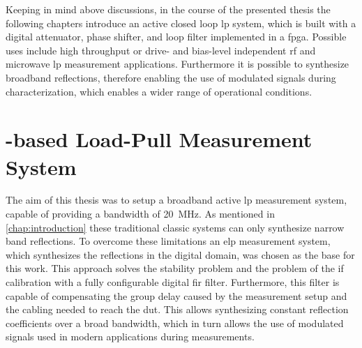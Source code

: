 \documentclass[12pt,a4paper,parskip=full,abstract=true,BCOR=12mm,twoside,open=right]{scrreprt}
\begin{document}
Keeping in mind above discussions, in the course of the presented thesis the following chapters introduce an active closed loop \gls{lp} system, which
is built with a digital attenuator, phase shifter, and loop filter implemented
in a \gls{fpga}. Possible uses include high throughput or drive- and bias-level
independent \gls{rf} and microwave \gls{lp} measurement applications. Furthermore
it is possible to synthesize broadband reflections, therefore enabling the use
of modulated signals during characterization, which enables a wider range of
operational conditions.


\chapter{-based Load-Pull Measurement System}
\label{chap:measurement_system}

The aim of this thesis was to setup a broadband active \gls{lp} measurement system, capable of providing a bandwidth of \SI{20}{\mega\hertz}.
As mentioned in \cref{chap:introduction} these traditional classic systems can only synthesize
narrow band reflections. To overcome these limitations an \gls{elp} measurement system, which
synthesizes the reflections in the digital domain, was chosen as the base for this work. This approach solves the stability problem
and the problem of the \gls{if} calibration with a fully configurable digital \gls{fir} filter. Furthermore,
this filter is capable of compensating the group delay caused by the measurement setup and
the cabling needed to reach the \gls{dut}. This allows synthesizing constant reflection
coefficients over a broad bandwidth, which in turn allows the use of modulated signals
used in modern applications during measurements.
\end{document}
